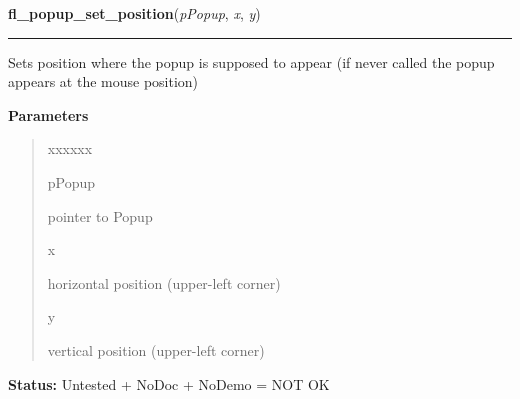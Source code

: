     \vspace{0.5ex}

\hspace{.8\funcindent}\begin{boxedminipage}{\funcwidth}

    \raggedright \textbf{fl\_popup\_set\_position}(\textit{pPopup}, \textit{x}, \textit{y})

    \vspace{-1.5ex}

    \rule{\textwidth}{0.5\fboxrule}
\setlength{\parskip}{2ex}
    Sets position where the popup is supposed to appear (if never called 
    the popup appears at the mouse position)

\setlength{\parskip}{1ex}
      \textbf{Parameters}
      \vspace{-1ex}

      \begin{quote}
        \begin{Ventry}{xxxxxx}

          \item[pPopup]

          pointer to Popup

          \item[x]

          horizontal position (upper-left corner)

          \item[y]

          vertical position (upper-left corner)

        \end{Ventry}

      \end{quote}

\textbf{Status:} Untested + NoDoc + NoDemo = NOT OK



    \end{boxedminipage}

    \label{xformslib:flpopup:fl_popup_get_policy}

    \vspace{0.5ex}


